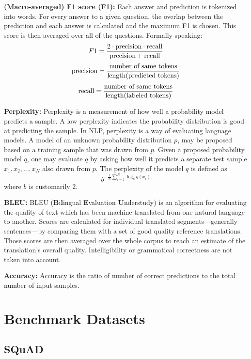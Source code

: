 \documentclass[]{krantz}
\begin{document}
\textbf{(Macro-averaged) F1 score (F1):} Each answer and prediction is tokenized into words. For every answer to a given question, the overlap between the prediction and each answer is calculated and the maximum F1 is chosen. This score is then averaged over all of the questions. Formally speaking:
\[
F1 = \frac{2 \cdot \hbox{precision}\cdot\hbox{recall}}{\hbox{precision}+\hbox{recall}} 
\]
\[
\hbox{precision} = \frac{\hbox{number of same tokens}}{\hbox{length(predicted tokens)}} \\
\]
\[
\hbox{recall} = \frac{\hbox{number of same tokens}}{\hbox{length(labeled tokens)}} \\
\]

\textbf{Perplexity:} Perplexity is a measurement of how well a probability model predicts a sample. A low perplexity indicates the probability distribution is good at predicting the sample. In NLP, perplexity is a way of evaluating language models. A model of an unknown probability distribution \(p\), may be proposed based on a training sample that was drawn from \(p\). Given a proposed probability model \(q\), one may evaluate \(q\) by asking how well it predicts a separate test sample \(x_1, x_2, ..., x_N\) also drawn from \(p\). The perplexity of the model \(q\) is defined as
\[ b^{-\frac{1}{N}\sum_{i=1}^N\log_bq(x_i)} \]
where \(b\) is customarily \(2\).

\textbf{BLEU:} BLEU (\textbf{B}i\textbf{l}ingual \textbf{E}valuation \textbf{U}nderstudy) is an algorithm for evaluating the quality of text which has been machine-translated from one natural language to another. Scores are calculated for individual translated segments---generally sentences---by comparing them with a set of good quality reference translations. Those scores are then averaged over the whole corpus to reach an estimate of the translation's overall quality. Intelligibility or grammatical correctness are not taken into account. \citep{papineni2002bleu}

\textbf{Accuracy:} Accuracy is the ratio of number of correct predictions to the total number of input samples.

\hypertarget{benchmark-datasets}{%
\section{Benchmark Datasets}\label{benchmark-datasets}}

\hypertarget{squad}{%
\subsection{SQuAD}\label{squad}}
\end{document}
